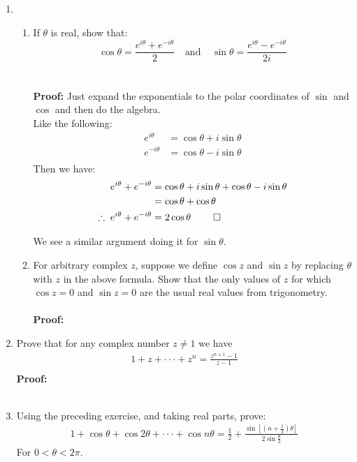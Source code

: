 \begin{enumerate}
	\item 
	\begin{enumerate}


		\item If $\theta$ is real, show that:
		\[\cos{\theta} = \frac{e^{i\theta} + e^{-i\theta}}{2} \;\;\;\ \text{and} \;\;\;\; \sin{\theta} = {\frac{e^{i\theta} - e^{-i\theta}}{2i}}\] \\
		\\
		\textbf{Proof:} Just expand the exponentials to the polar coordinates of $\sin$ and $\cos$ and then do the algebra. \\

		Like the following:
		\begin{align*}
			e^{i\theta} &= \cos\theta + i\sin\theta \\
			e^{-i\theta} &= \cos\theta - i\sin\theta \\
		\end{align*}
		Then we have:
		\begin{align*}
			e^{i\theta} + e^{-i\theta} &= \cos\theta + i\sin\theta + \cos\theta - i\sin\theta \\
			&= \cos\theta + \cos\theta \\
			\therefore \; e^{i\theta} + e^{-i\theta} &= 2\cos\theta \; \qed 
		\end{align*}

		We see a similar argument doing it for $\sin\theta.$
	

		\item For arbitrary complex $z$, suppose we define $\cos{z}$ and $\sin{z}$ by replacing $\theta$ with $z$ in the above formula. Show that the only values of $z$ for which $\cos{z} = 0$ and $\sin{z} = 0$ are the usual real values from trigonometry. \\
		\\
		\textbf{Proof:}
		\\
	\end{enumerate}

	\item Prove that for any complex number $z \neq 1$ we have
	\begin{align*}
		1 + z + \cdot\cdot\cdot + z^n = \frac{z^{n + 1} - 1}{z - 1} \\
	\end{align*}
	\textbf{Proof:} \\
	\\


	\item Using the preceding exercise, and taking real parts, prove:
	\begin{align*}
		1 + \cos\theta + \cos2\theta + \cdot\cdot\cdot + \cos n\theta = \frac{1}{2} + \frac{\sin[(n + \frac{1}{2})\theta]}{2\sin{\frac{\theta}{2}}}
	\end{align*}
	For $0 < \theta < 2\pi.$



\end{enumerate}
